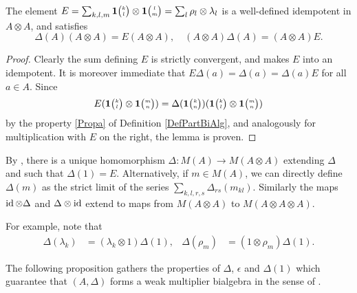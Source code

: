 \begin{Lem} The element $E = \sum_{k,l,m} \mathbf{1}{\tiny {\begin{pmatrix} k\\l\end{pmatrix}}}\otimes \mathbf{1}{\tiny {\begin{pmatrix} l\\m\end{pmatrix}}}= \sum_l \rho_l\otimes \lambda_l$ is a well-defined idempotent in $A\otimes A$, and satisfies \[\Delta(A)(A\otimes A)=E(A\otimes A),\quad (A\otimes A)\Delta(A)= (A\otimes A)E.\]
\end{Lem} 
\begin{proof} Clearly the sum defining $E$ is strictly convergent, and makes $E$ into an idempotent. It is moreover immediate that $E\Delta(a)=\Delta(a) = \Delta(a)E$ for all $a\in A$. Since \[E(\mathbf{1}{\tiny {\begin{pmatrix} k\\l\end{pmatrix}}}\otimes \mathbf{1}{\tiny {\begin{pmatrix} m\\n\end{pmatrix}}}) = \Delta(\mathbf{1}{\tiny {\begin{pmatrix} k\\n\end{pmatrix}}})(\mathbf{1}{\tiny {\begin{pmatrix} k\\l\end{pmatrix}}}\otimes \mathbf{1}{\tiny {\begin{pmatrix} m\\n\end{pmatrix}}}) \] by the property \ref{Propa} of Definition \ref{DefPartBiAlg}, and analogously for multiplication with $E$ on the right, the lemma is proven. 
\end{proof} 

By \cite[Proposition A.3]{VDW2}, there is a unique homomorphism $\Delta:M(A)\rightarrow M(A\otimes A)$ extending $\Delta$ and such that $\Delta(1) = E$. Alternatively, if $m\in M(A)$, we can directly define $\Delta(m)$ as the strict limit of the series $\sum_{k,l,r,s} \Delta_{rs}(m_{kl})$. Similarly the maps $\operatorname{id}\otimes \Delta$ and $\Delta\otimes \operatorname{id}$ extend to maps from $M(A\otimes A)$ to $M(A\otimes A\otimes A)$. 

For example, note that
\begin{align} \label{eq:delta-lambda-rho} \Delta(\lambda_{k}) &=
  (\lambda_{k} \otimes 1)\Delta(1), & \Delta(\rho_{m}) &= (1 \otimes \rho_{m})\Delta(1).
\end{align}

The following proposition gathers the properties of $\Delta$, $\epsilon$ and $\Delta(1)$ which guarantee that $(A,\Delta)$ forms a weak multiplier bialgebra in the sense of \cite[Definition 2.1]{Boh1}.

